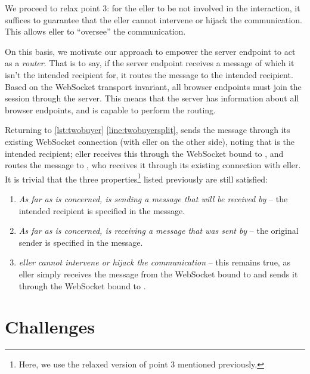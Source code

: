We proceed to relax point 3: for the eller to be
not involved in the interaction, it suffices to guarantee that
the eller cannot intervene or hijack the communication.
This allows eller to ``oversee'' the communication.

On this basis, we motivate our approach to empower the 
server endpoint to act as a \textit{router}. 
That is to say, if the server endpoint receives a message
of which it isn't the intended recipient for, 
it routes the message to the intended recipient. 
Based on the WebSocket transport invariant,
all browser endpoints must join the session
through the server. This means that the server has information about
all browser endpoints, 
and is capable to perform the routing.

Returning to \cref{lst:twobuyer} \cref{line:twobuyersplit},
 sends the  message through its existing
WebSocket connection (with eller on the other side),
noting that  is the intended recipient;
eller receives this through the WebSocket bound to
, and routes the message to , who receives it through
its existing connection with eller.
It is trivial that the three properties\footnote{Here, we use the relaxed
version of point 3 mentioned previously.} listed previously are still
satisfied: 

\begin{enumerate}
\item
\textit{As far as  is concerned,  is sending
a message that will be received by } -- 
the intended recipient is specified in the message.

\item
\textit{As far as  is concerned,  is receiving
a message that was sent by } --
the original sender is specified in the message.

\item
\textit{eller cannot intervene or hijack the communication} --
this remains true, as eller simply receives the message
from the WebSocket bound to  and sends it through the
WebSocket bound to .

\end{enumerate}

\section{Challenges}
\label{section:routerchallenges}

